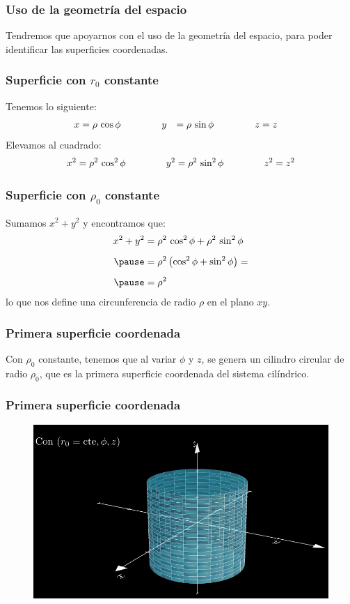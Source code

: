 \documentclass[12pt]{beamer}
\begin{document}
\begin{frame}
\frametitle{Uso de la geometría del espacio}
Tendremos que apoyarnos con el uso de la geometría del espacio, para poder identificar las superficies coordenadas.
\end{frame}
\begin{frame}
\frametitle{Superficie con $r_{0}$ constante}
Tenemos lo siguiente:
\pause
\begin{align*}
x &= \rho \, \cos \phi \hspace{1.5cm} y &= \rho \, \sin \phi \hspace{1.5cm} z &= z
\end{align*}
\pause
Elevamos al cuadrado:
\begin{align*}
x^{2} = \rho^{2} \, \cos^{2} \phi \hspace{1.5cm} y^{2} = \rho^{2} \, \sin^{2} \phi \hspace{1.5cm} z^{2} = z^{2}
\end{align*}
\end{frame}
\begin{frame}
\frametitle{Superficie con $\rho_{0}$ constante}
Sumamos $x^{2} + y^{2}$  y encontramos que:
\pause
\begin{eqnarray*}
\begin{aligned}
x^{2} + y^{2} &= \rho^{2} \, \cos^{2} \phi + \rho^{2} \, \sin^{2} \phi \\[0.5em] \pause
&= \rho^{2} \left( \cos^{2} \phi + \sin^{2} \phi \right) = \\[0.5em] \pause
&= \rho^{2} 
\end{aligned}
\end{eqnarray*}
lo que nos define una circunferencia de radio $\rho$ en el plano $xy$.
\end{frame}
\begin{frame}
\frametitle{Primera superficie coordenada}
Con $\rho_{0}$ constante, tenemos que al variar $\phi$ y $z$, se genera un cilindro circular de radio $\rho_{0}$, que es la primera superficie coordenada del sistema cilíndrico.
\end{frame}
{ %
\begin{frame}
\frametitle{Primera superficie coordenada}
\begin{figure}
   \centering
   \includegraphics[width=0.95\linewidth]{Imagenes/superficies_cilindricas_01.png}
   \label{fig:superficies_cilindricas_01}
\end{figure}
\end{frame}
}
\end{document}
